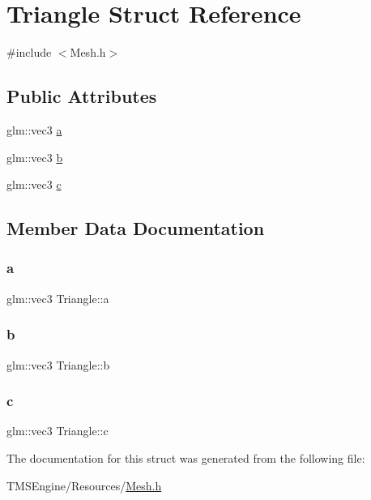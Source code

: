 \hypertarget{struct_triangle}{}\section{Triangle Struct Reference}
\label{struct_triangle}


{\ttfamily \#include $<$Mesh.\+h$>$}

\subsection*{Public Attributes}
\begin{DoxyCompactItemize}
\item 
glm\+::vec3 \hyperlink{struct_triangle_a75a142a237477a294d9625379a6076d7}{a}
\item 
glm\+::vec3 \hyperlink{struct_triangle_a926bd99a7e345b5527ccbee07f0e6b0b}{b}
\item 
glm\+::vec3 \hyperlink{struct_triangle_aaad6c6cb9cf100dd36798fc3e34b1936}{c}
\end{DoxyCompactItemize}


\subsection{Member Data Documentation}
\mbox{\label{struct_triangle_a75a142a237477a294d9625379a6076d7}} 
\subsubsection{\texorpdfstring{a}{a}}
{\footnotesize\ttfamily glm\+::vec3 Triangle\+::a}

\mbox{\label{struct_triangle_a926bd99a7e345b5527ccbee07f0e6b0b}} 
\subsubsection{\texorpdfstring{b}{b}}
{\footnotesize\ttfamily glm\+::vec3 Triangle\+::b}

\mbox{\label{struct_triangle_aaad6c6cb9cf100dd36798fc3e34b1936}} 
\subsubsection{\texorpdfstring{c}{c}}
{\footnotesize\ttfamily glm\+::vec3 Triangle\+::c}



The documentation for this struct was generated from the following file\+:\begin{DoxyCompactItemize}
\item 
T\+M\+S\+Engine/\+Resources/\hyperlink{_mesh_8h}{Mesh.\+h}\end{DoxyCompactItemize}
